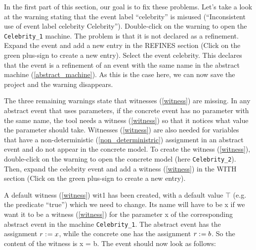 In the first part of this section, our goal is to fix these problems. Let's take a look at the warning stating that the event label ``celebrity'' is misused (``Inconsistent use of event label celebrity	Celebrity''). Double-click on the warning to open the \texttt{Celebrity\_1} machine. The problem is that it is not declared as a refinement. Expand the event and add a new entry in the \textsf{REFINES} section (Click on the green plus-sign to create a new entry). Select the event \textsf{celebrity}. This declares that the event is a refinement of an event with the same name in the abstract machine (\ref{abstract_machine}). As this is the case here, we can now save the project and the warning disappears.

The three remaining warnings state that witnesses (\ref{witness}) are missing. In any abstract event that uses parameters, if the concrete event has no parameter with the same name, the tool needs a witness (\ref{witness}) so that it notices what value the parameter should take. Witnesses (\ref{witness}) are also needed for variables that have a non-deterministic (\ref{non_deterministric}) assignment in an abstract event and do not appear in the concrete model. To create the witness (\ref{witness}), double-click on the warning to open the concrete model (here \texttt{Celebrity\_2}). Then, expand the \textsf{celebrity} event and add a witness (\ref{witness}) in the \textsf{WITH} section (Click on the green plus-sign to create a new entry).

A default witness (\ref{witness}) \textsf{wit1} has been created, with a default value \textsf{$\top$} (e.g. the predicate ``true'') which we need to change. Its name will have to be \textsf{x} if we want it to be a witness (\ref{witness}) for the parameter \textsf{x} of the corresponding abstract event in the machine \texttt{Celebrity\_1}. The abstract event has the assignment \textsf{$r \mathrel{:\mkern1mu=} x$}, while the concrete one has the assignment \textsf{$r \mathrel{:\mkern1mu=} b$}. So the content of the witness is \textsf{x = b}. The event should now look as follows: 

\begin{description}
		\begin{description}
		\WhenGrd
			\begin{description}
			\end{description}
		\Witnesses
			\begin{description}
			\nItem{ x }{ x=b }
			\end{description}
		\ThenAct
			\begin{description}
			\nItemX{ act1 }{ r :=  b }
			\end{description}
		\EndAct
		\end{description}
\end{description}

